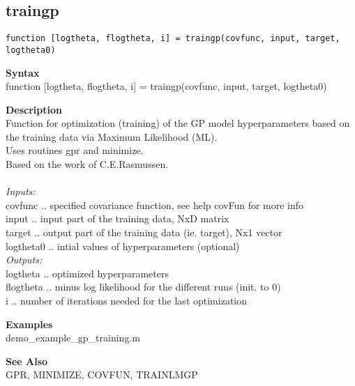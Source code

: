 \subsection*{traingp} \label{fun:traingp}

\texttt{function [logtheta, flogtheta, i] = traingp(covfunc,
input, target, logtheta0)}

\textbf{Syntax}
\\  function [logtheta, flogtheta, i] = traingp(covfunc, input, target, logtheta0)

\textbf{Description}
\\ Function for optimization (training) of the GP model hyperparameters
 based on the training data via Maximum Likelihood (ML).
\\ Uses routines gpr and minimize.
\\ Based on the work of C.E.Rasmussen.
\\
\\ \emph{Inputs:}
\\ covfunc .. specified covariance function, see help covFun for more info
\\ input .. input part of the training data,  NxD matrix
\\ target .. output part of the training data (ie. target), Nx1 vector
\\ logtheta0 .. intial values of hyperparameters (optional)
\\ \emph{Outputs:}
\\ logtheta .. optimized hyperparameters
\\ flogtheta .. minus log likelihood for the different runs (init. to 0)
\\ i .. number of iterations needed for the last optimization

\textbf{Examples}
\\ demo\_example\_gp\_training.m

\textbf{See Also}
\\ GPR, MINIMIZE, COVFUN, TRAINLMGP
